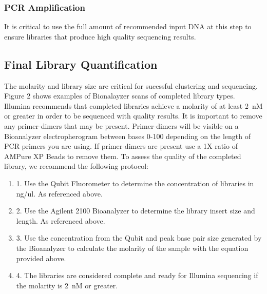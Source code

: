 \documentclass[graybox]{svmult}
\begin{document}
\subsubsection{PCR Amplification}
It is critical to use the full amount of recommended input DNA at this step to ensure libraries that produce high quality sequencing results. 

\subsection{Final Library Quantification}

The molarity and library size are critical for sucessful clustering and sequencing.  Figure 2 shows examples of Bionalayzer scans of completed library types. Illumina recommends that completed libraries achieve a molarity of at least 2~nM or greater in order to be sequenced with quality results.  It is important to remove any primer-dimers that may be present. Primer-dimers will be visible on a Bioanalyzer electropherogram between bases 0-100 depending on the length of PCR primers you are using. If primer-dimers are present use a 1X ratio of AMPure XP Beads to remove them. To assess the quality of the completed library, we recommend the following protocol:
\begin{enumerate}
\item{1.      Use the Qubit Fluorometer to determine the concentration of libraries in ng/ul. As referenced above.}
\item{2.      Use the Agilent 2100 Bioanalyzer to determine the library insert size and length. As referenced above.}
\item{3.      Use the concentration from the Qubit and peak base pair size generated by the Bioanalyzer to calculate the molarity of the sample with the equation provided above.}
\item{4.      The libraries are considered complete and ready for Illumina sequencing if the molarity is 2~nM or greater.}
\end{enumerate}
\end{document}
